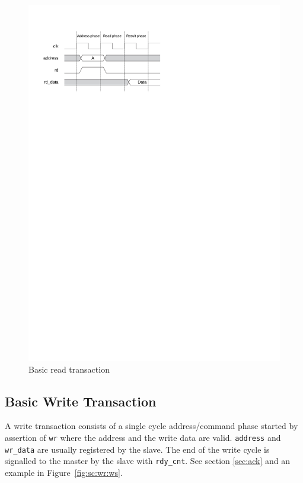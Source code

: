 \documentclass[a4paper,12pt]{scrartcl}
\newcommand{\sign}[1]{{\texttt{#1}}}
\begin{document}
\begin{figure}
    \centering
    \includegraphics{figures/sc_basic_rd}
    \caption{Basic read transaction}
    \label{fig:sc:basic:rd}
\end{figure}

\subsection{Basic Write Transaction}

A write transaction consists of a single cycle address/command phase
started by assertion of \sign{wr} where the address and the write
data are valid. \sign{address} and \sign{wr\_data} are usually
registered by the slave. The end of the write cycle is signalled to
the master by the slave with \sign{rdy\_cnt}. See section
\ref{sec:ack} and an example in Figure~\ref{fig:sc:wr:ws}.
\end{document}
